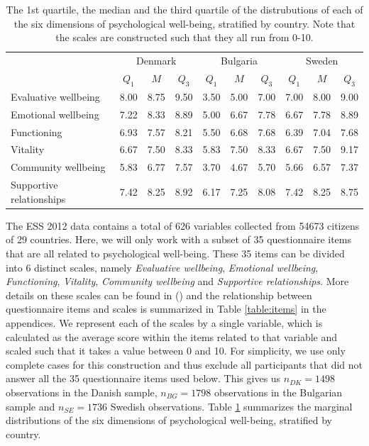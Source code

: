 \documentclass[titlepage,11pt,twoside]{article}
\begin{document}
{\begin{table}[t]
\centering
\begin{tabular}{lccccccccc}
  \hline
  & \multicolumn{3}{c}{Denmark} & \multicolumn{3}{c}{Bulgaria} & \multicolumn{3}{c}{Sweden} \\
 & $Q_1$ & $M$ & $Q_3$ \quad & $Q_1$ & $M$ & $Q_3$ \quad & $Q_1$ & $M$ & $Q_3$ \\
  \hline
 Evaluative wellbeing & 8.00 & 8.75 & 9.50 & 3.50 & 5.00 & 7.00 & 7.00 & 8.00 & 9.00 \\
 Emotional wellbeing & 7.22 & 8.33 & 8.89 & 5.00 & 6.67 & 7.78 & 6.67 & 7.78 & 8.89 \\
Functioning & 6.93 & 7.57 & 8.21 & 5.50 & 6.68 & 7.68 & 6.39 & 7.04 & 7.68 \\
Vitality & 6.67 & 7.50 & 8.33 & 5.83 & 7.50 & 8.33 & 6.67 & 7.50 & 9.17 \\
 Community wellbeing & 5.83 & 6.77 & 7.57 & 3.70 & 4.67 & 5.70 & 5.66 & 6.57 & 7.37 \\
Supportive relationships & 7.42 & 8.25 & 8.92 & 6.17 & 7.25 & 8.08 & 7.42 & 8.25 & 8.75 \\
   \hline
\end{tabular}
\caption{The 1st quartile, the median and the third quartile of the distrubutions of each of the six dimensions of psychological well-being, stratified by country. Note that the scales are constructed such that they all run from 0-10.}
\label{tableDistr}
\end{table}



The ESS 2012 data contains a total of 626 variables collected from 54673 citizens of 29 countries. Here, we will only work with a subset of 35 questionnaire items that are all related to psychological well-being. These 35 items can be divided into 6 distinct scales, namely \textit{Evaluative wellbeing}, \textit{Emotional wellbeing}, \textit{Functioning}, \textit{Vitality}, \textit{Community wellbeing} and \textit{Supportive relationships}. More details on these scales can be found in (\cite{ESStopline5}) and the relationship between questionnaire items and scales is summarized in Table \ref{table:items} in the appendices. We represent each of the scales by a single variable, which is calculated as the average score within the items related to that variable and scaled such that it takes a value between 0 and 10. For simplicity, we use only complete cases for this construction and thus exclude all participants that did not answer all the 35 questionnaire items used below. This gives us $n_{DK} = 1498$ observations in the Danish sample, $n_{BG} = 1798$ observations in the Bulgarian sample and $n_{SE} = 1736$ Swedish observations. Table \ref{tableDistr} summarizes the marginal distributions of the six dimensions of psychological well-being, stratified by country.



}
\end{document}
